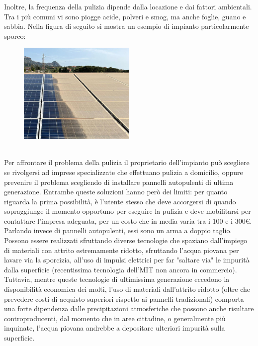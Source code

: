 \documentclass[a4paper, 12pt]{article}
\begin{document}
	Inoltre, la frequenza della pulizia dipende dalla locazione e dai fattori ambientali. Tra i più comuni vi sono piogge acide, polveri e smog, ma anche foglie, guano e sabbia. %
	Nella figura di seguito si mostra un esempio di impianto particolarmente sporco: %
	\begin{figure}[h]
		\centering\includegraphics[width=0.5\textwidth]{Images/pannelli_sporchi2.jpg}
	\end{figure}\\
	Per affrontare il problema della pulizia il proprietario dell'impianto può scegliere se rivolgersi ad imprese specializzate che effettuano pulizia a domicilio, oppure prevenire il problema scegliendo di installare pannelli autopulenti di ultima generazione. %
	Entrambe queste soluzioni hanno però dei limiti: per quanto riguarda la prima possibilità, è l'utente stesso che deve accorgersi di quando sopraggiunge il momento opportuno per eseguire la pulizia e deve mobilitarsi per contattare l'impresa adeguata, per un costo che in media varia tra i 100 e i 300\euro.\\
	Parlando invece di pannelli autopulenti, essi sono un arma a doppio taglio.\\
	Possono essere realizzati sfruttando diverse tecnologie che spaziano dall'impiego di materiali con attrito estremamente ridotto, sfruttando l'acqua piovana per lavare via la sporcizia, all'uso di impulsi elettrici per far "saltare via" le impurità dalla superficie (recentissima tecnologia dell'MIT non ancora in commercio). Tuttavia, mentre queste tecnologie di ultimissima generazione eccedono la disponibilità economica dei molti, l'uso di materiali dall'attrito ridotto (oltre che prevedere costi di acquisto superiori rispetto ai pannelli tradizionali) comporta una forte dipendenza dalle precipitazioni atmosferiche che possono anche risultare controproducenti, dal momento che in aree cittadine, o generalmente più inquinate, l'acqua piovana andrebbe a depositare ulteriori impurità sulla superficie.\\
\end{document}
